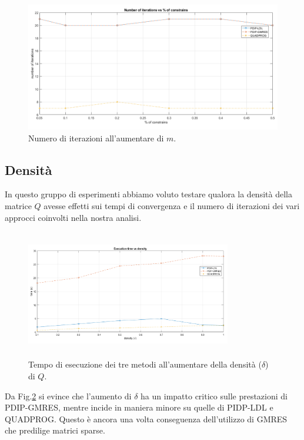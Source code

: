\begin{figure}[!h]
    \centering
    \includegraphics[width=\textwidth]{img/MU8.png}
    \caption{Numero di iterazioni all'aumentare di $m$. \label{fig:exp2.2}}
\end{figure}


\subsection{Densità}

 In questo gruppo di esperimenti abbiamo voluto testare qualora la densità della matrice $Q$ avesse effetti sui tempi di convergenza e il numero di iterazioni dei vari approcci coinvolti nella nostra analisi.

\begin{figure}[!h]
    \centering
    \includegraphics[width=0.8\textwidth, height=5.6cm]{img/MU4.png}
    \caption{Tempo di esecuzione dei tre metodi all'aumentare della densità ($\delta$) di $Q$. \label{fig:exp3.1}}
\end{figure}
 
Da Fig.\ref{fig:exp3.1} si evince che l'aumento di $\delta$ ha un impatto critico sulle prestazioni di PDIP-GMRES, mentre incide in maniera minore su quelle di PIDP-LDL e QUADPROG. Questo è ancora una volta conseguenza dell'utilizzo di GMRES che predilige matrici sparse. 

